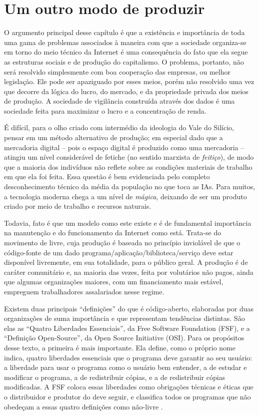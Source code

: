 \section{Um outro modo de produzir}

O argumento principal desse capítulo é que a existência e importância de toda uma gama de problemas associados à maneira com que a sociedade organiza-se em torno do meio técnico da Internet é uma consequência do fato que ela segue as estruturas sociais e de produção do capitalismo.
O problema, portanto, não será resolvido simplesmente com boa cooperação das empresas, ou melhor legislação.
Ele pode ser apaziguado por esses meios, porém não resolvido uma vez que decorre da lógica do lucro, do mercado, e da propriedade privada dos meios de produção.
A sociedade de vigilância construída através dos dados é uma sociedade feita para maximizar o lucro e a concentração de renda.

É difícil, para o olho criado com intermédio da ideologia do Vale do Silício, pensar em um método alternativo de produção; em especial dado que a mercadoria digital -- pois o espaço digital é produzido como uma mercadoria -- atingiu um nível considerável de fetiche (no sentido marxista de \textit{feitiço}), de modo que a maioria dos indivíduos não reflete sobre as condições materiais de trabalho em que ela foi feita.
Essa questão é bem evidenciada pelo completo desconhecimento técnico da média da população no que toca as IAs.
Para muitos, a tecnologia moderna chega a um nível de \textit{mágica}, deixando de ser um produto criado por meio de trabalho e recursos naturais.

Todavia, fato é que um modelo como este existe e é de fundamental importância na manutenção e do funcionamento da Internet como está.
Trata-se do movimento de \swr{} livre, cuja produção é baseada no princípio inviolável de que o código-fonte de um dado programa/aplicação/biblioteca/serviço deve estar disponível livremente, em sua totalidade, para o público geral.
A produção é de caráter comunitário e, na maioria das vezes, feita por volutários não pagos, ainda que algumas organizações maiores, com um financiamento mais estável, empreguem trabalhadores assalariados nesse regime.

Existem duas principais ``definições'' do que é código-aberto, elaboradas por duas organizações de suma importância e que representam tendências distintas.
São elas as ``Quatro Liberdades Essenciais'', da Free Software Foundation (FSF), e a ``Definição Open-Source'', da Open Source Initiative (OSI).
Para os propósitos desse texto, a primeira é mais importante.
Ela define, como o próprio nome indica, quatro liberdades essenciais que o programa deve garantir ao seu usuário: a liberdade para usar o programa como o usuário bem entender, a de estudar e modificar o programa, a de redistribuir cópias, e a de redistribuir cópias modificadas.
A FSF coloca essas liberdades como obrigações técnicas e éticas que o distribuidor e produtor do \swr{} deve seguir, e classifica todos os programas que não obedeçam a essas quatro definições como não-livre \cite{freesoftwarefoundation_what_}.

